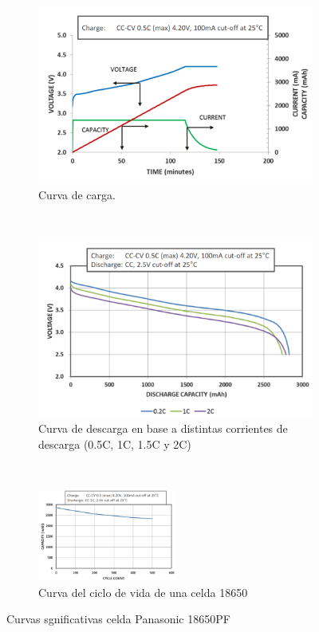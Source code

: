 \documentclass[10pt,a4paper]{article}
\begin{document}
\begin{figure}[h!]
    \begin{subfigure}[t]{.5\textwidth}
	\includegraphics[width=1\textwidth]{cc_cv_18650.png}
	\caption{Curva de carga.}
	\label{cc_cv_18650}
    \end{subfigure}%
    ~ 
    \begin{subfigure}[t]{.5\textwidth}
	\includegraphics[width=1\textwidth]{discharge_18650.png}
	\caption{Curva de descarga en base a distintas corrientes de descarga (0.5C,
	1C, 1.5C y 2C)}
	\label{descarga_18650}
    \end{subfigure}
    ~ 
    \begin{centering}
	\begin{subfigure}[t]{1\textwidth}
	    \centering
	    \includegraphics[width=0.5\textwidth]{life_cycle_18650.png}
	    \caption{Curva del ciclo de vida de una celda 18650}
	    \label{life_cycle_18650}
	\end{subfigure}
    \end{centering}
    \caption{Curvas sgnificativas celda Panasonic 18650PF}
    \label{curvas_sign_18650}
\end{figure}
\end{document}
